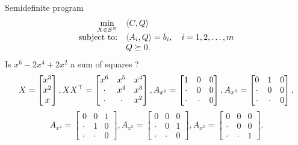 \begin{frame}{Semidefinite program}
      \begin{equation*}
        \label{eq:sdp_standard}
        \begin{array}{rl}
          \min\limits_{X \in \SymK[N]} & \la C, Q \ra\\
          \text{subject to:} & \la A_i, Q \ra = b_i, \quad i=1,2,\ldots,m\\
          & Q \succeq 0.
        \end{array}
      \end{equation*}
      Is $x^6 - 2x^4 + 2x^2$ a sum of squares ?
      $$
      X =
      \begin{bmatrix}
        x^3\\
        x^2\\
        x
      \end{bmatrix},
      XX^\top =
      \begin{bmatrix}
        x^6 & x^5 & x^4\\
        \cdot & x^4 & x^3\\
        \cdot & \cdot & x^2
      \end{bmatrix},
      A_{x^6} =
      \begin{bmatrix}
        1 & 0 & 0\\
        \cdot & 0 & 0\\
        \cdot & \cdot & 0
      \end{bmatrix},
      A_{x^5} =
      \begin{bmatrix}
        0 & 1 & 0\\
        \cdot & 0 & 0\\
        \cdot & \cdot & 0
      \end{bmatrix},
      $$
      $$
      A_{x^4} =
      \begin{bmatrix}
        0 & 0 & 1\\
        \cdot & 1 & 0\\
        \cdot & \cdot & 0
      \end{bmatrix},
      A_{x^3} =
      \begin{bmatrix}
        0 & 0 & 0\\
        \cdot & 0 & 1\\
        \cdot & \cdot & 0
      \end{bmatrix},
      A_{x^2} =
      \begin{bmatrix}
        0 & 0 & 0\\
        \cdot & 0 & 0\\
        \cdot & \cdot & 1
      \end{bmatrix}.
      $$

\end{frame}


